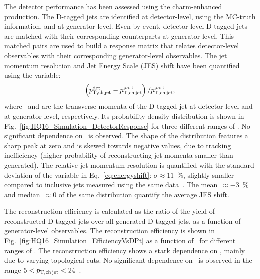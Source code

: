 \documentclass[a4paper]{jpconf}
\begin{document}
The detector performance has been assessed using the charm-enhanced production. The D-tagged jets are identified at detector-level, 
using the MC-truth information,
and at generator-level.
Even-by-event, detector-level D-tagged jets are matched with their corresponding counterparts at generator-level.
This matched pairs are used to build a response matrix that relates detector-level observables with their corresponding generator-level observables. 
The jet momentum resolution and Jet Energy Scale (JES) shift have been quantified using the variable: 
\begin{equation}
\left( p_{\mathrm{T,ch\,jet}}^{\mathrm{det}} - p_{\mathrm{T,ch\,jet}}^{\mathrm{part}} \right) / p_{\mathrm{T,ch\,jet}}^{\mathrm{part}},
\label{eq:energyshift}
\end{equation}
where \ptchjetdet\ and \ptchjetgen are the transverse momenta of the D-tagged jet at detector-level and at generator-level, respectively.
Its probability density distribution is shown in Fig.~\ref{fig:HQ16_Simulation_DetectorResponse} for three different ranges of \ptchjetgen. No significant dependence on \ptchjetgen\ is observed.
The shape of the distribution features a sharp peak at zero and is skewed towards negative values, due to tracking inefficiency (higher probability of
reconstructing jet momenta smaller than generated). The relative jet momentum resolution is quantified with the standard deviation
of the variable in Eq.~\ref{eq:energyshift}: $\sigma\approx11$~\%, slightly smaller compared to inclusive jets measured using the same data~\cite{ALICE:2015e}.
The mean~$\approx-3$~\% and median~$\approx0$ of the same distribution quantify the average JES shift.

The reconstruction efficiency is calculated as the ratio of the yield of reconstructed D-tagged jets over all generated D-tagged jets, as a function of generator-level observables.
The reconstruction efficiency is shown in Fig.~\ref{fig:HQ16_Simulation_EfficiencyVsDPt} as a function of \ptd\ for different ranges of \ptchjet. The reconstruction efficiency shows a stark dependence on \ptd, mainly due to
varying topological cuts. No significant dependence on \ptchjet\ is observed in the range $5<p_{\mathrm{T,ch\, jet}}<24$~\GeVc.
\end{document}
